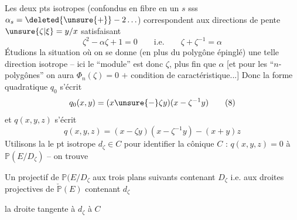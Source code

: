 Les deux pts isotropes (confondus  en  fibre en un $s$ sss $\alpha_s=\deleted{\unsure{+}}-2\ldots$) correspondent aux  directions de pente $\unsure{\zeta|\xi}=y/x$ satisfaisant
\[
\zeta^2-\alpha\zeta+1=0\qquad\text{i.e.}\qquad\zeta+\zeta^{-1}=\alpha
\tag*{(7)}
\]
Étudions la situation où on se donne (en plus du polygône épinglé) une telle direction isotrope -- ici le  ``module'' est donc  $\zeta$, plus fin que $\alpha$ [et pour les  ``$n$-polygônes'' on aura $\Phi_n(\zeta)=0$  $+$ condition de caractéristique...] Donc la forme quadratique $q_0$ s'écrit
\[
q_0(x,y)=(x\unsure{-}\zeta y)(x-\zeta^{-1}y)
\tag*{(8)}
\]
et $q(x,y,z)$ s'écrit
\[
q(x,y,z)=(x-\zeta y)(x-\zeta^{-1}y)-(x+y)z
\tag*{(9)}
\]
Utilisons \deleted{\unsure{$\zeta$}} la  le pt isotrope $d_\zeta\in C$  pour identifier la cônique $C$ : $q(x,y,z)=0$ à $\mathbb P(E/D_\zeta)$ -- on trouve

Un  projectif de $\mathbb P(E/D_\zeta$  aux trois plans suivants contenant $D_\zeta$ i.e. aux droites projectives de $\check{\mathbb P}(E)$ contenant $d_\zeta$

  la droite tangente à $d_\zeta$ à $C$
